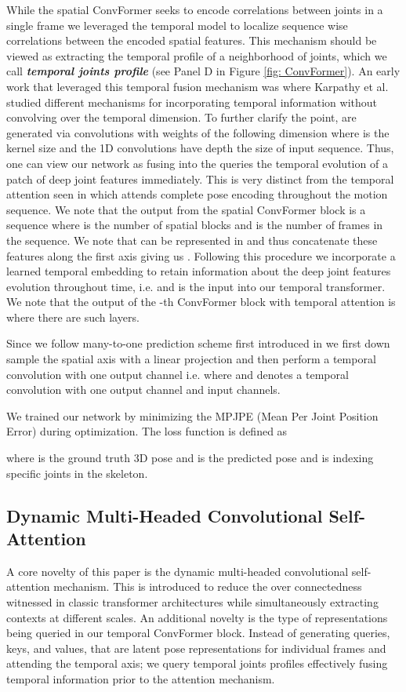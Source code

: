 \documentclass{article}
\begin{document}
While the spatial ConvFormer seeks to encode correlations between joints in a single frame we leveraged the temporal model to localize sequence wise correlations between the encoded spatial features. This mechanism should be viewed as extracting the temporal profile of a neighborhood of joints, which we call \textbf{\textit{temporal joints profile}} (see Panel D in Figure \ref{fig: ConvFormer}). An early work that leveraged this temporal fusion mechanism was  \cite{KTSLSF14} where Karpathy et al. studied different mechanisms for incorporating temporal information without convolving over the temporal dimension. To further clarify the point,  are generated via convolutions with weights of the following dimension  where  is the kernel size and the 1D convolutions have depth the size of input sequence. Thus, one can view our network as fusing into the queries the temporal evolution of a patch of deep joint features immediately. This is very distinct from the temporal attention seen in \cite{ZZMYCD21} which attends complete pose encoding throughout the motion sequence. We note that the output from the spatial ConvFormer block is a sequence  where  is the number of spatial blocks and  is the number of frames in the sequence. We note that  can be represented in  and thus concatenate these features along the first axis giving us . Following this procedure we incorporate a learned temporal embedding to retain information about the deep joint features evolution throughout time, i.e.  and  is the input into our temporal transformer. We note that the output of the -th ConvFormer block with temporal attention is  where there are  such layers. 


Since we follow many-to-one prediction scheme first introduced in \cite{PFGA19} we first down sample the spatial axis with a linear projection and then perform a temporal convolution with one output channel i.e.   where  and  denotes a temporal convolution with one output channel and  input channels. 


We trained our network by minimizing the MPJPE (Mean Per Joint Position Error) during optimization. The loss function is defined as

where  is the ground truth 3D pose and  is the predicted pose and  is indexing specific joints in the skeleton. 


\subsection{Dynamic Multi-Headed Convolutional Self-Attention}
A core novelty of this paper is the dynamic multi-headed convolutional self-attention mechanism. This is introduced to reduce the over connectedness witnessed in classic transformer architectures while simultaneously extracting contexts at different scales. An additional novelty is the type of representations being queried in our temporal ConvFormer block. Instead of generating queries, keys, and values, that are latent pose representations for individual frames and attending the temporal axis; we query temporal joints profiles effectively fusing temporal information prior to the attention mechanism. 
\end{document}
